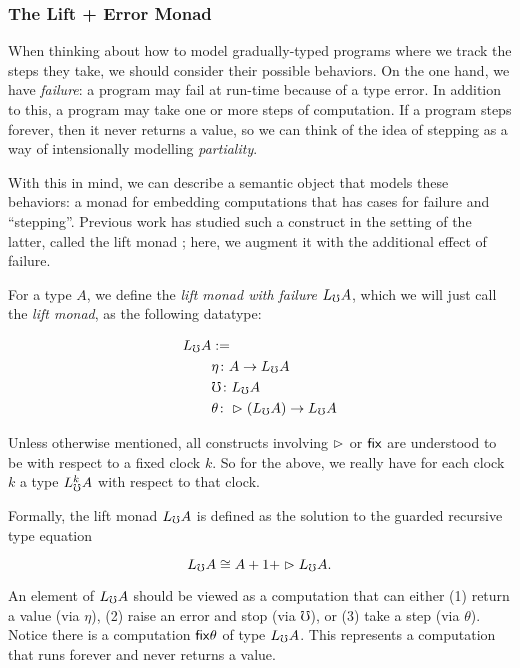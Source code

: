 \subsubsection{The Lift + Error Monad}\label{sec:lift-monad}

When thinking about how to model gradually-typed programs where we track the steps they take,
we should consider their possible behaviors. On the one hand, we have \emph{failure}: a program may fail
at run-time because of a type error. In addition to this, a program may take one or more steps of computation.
If a program steps forever, then it never returns a value,
so we can think of the idea of stepping as a way of intensionally modelling \emph{partiality}.

With this in mind, we can describe a semantic object that models these behaviors: a monad
for embedding computations that has cases for failure and ``stepping''.
Previous work has studied such a construct in the setting of the latter, called the lift
monad \cite{mogelberg-paviotti2016}; here, we augment it with the additional effect of failure.

For a type $A$, we define the \emph{lift monad with failure} $L_\mho A$, which we will just call
the \emph{lift monad}, as the following datatype:

\begin{align*}
  L_\mho A &:= \\
  &\eta \colon A \to L_\mho A \\
  &\mho \colon L_\mho A \\
  &\theta \colon \vartriangleright (L_\mho A) \to L_\mho A
\end{align*}

Unless otherwise mentioned, all constructs involving $\vartriangleright$ or $\mathsf{fix}$
are understood to be with respect to a fixed clock $k$. So for the above, we really have for each
clock $k$ a type $L_\mho^k A$ with respect to that clock.

Formally, the lift monad $L_\mho A$ is defined as the solution to the guarded recursive type equation

\[ L_\mho A \cong A + 1 + \vartriangleright L_\mho A. \]

An element of $L_\mho A$ should be viewed as a computation that can either (1) return a value (via $\eta$),
(2) raise an error and stop (via $\mho$), or (3) take a step (via $\theta$).
%
Notice there is a computation $\mathsf{fix} \theta$ of type $L_\mho A$. This represents a computation
that runs forever and never returns a value.

